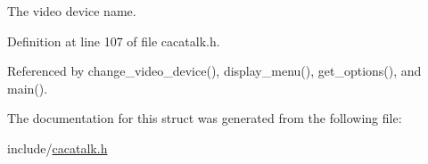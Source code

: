 \-The video device name. 



\-Definition at line 107 of file cacatalk.\-h.



\-Referenced by change\-\_\-video\-\_\-device(), display\-\_\-menu(), get\-\_\-options(), and main().



\-The documentation for this struct was generated from the following file\-:\begin{DoxyCompactItemize}
\item 
include/\hyperlink{cacatalk_8h}{cacatalk.\-h}\end{DoxyCompactItemize}
